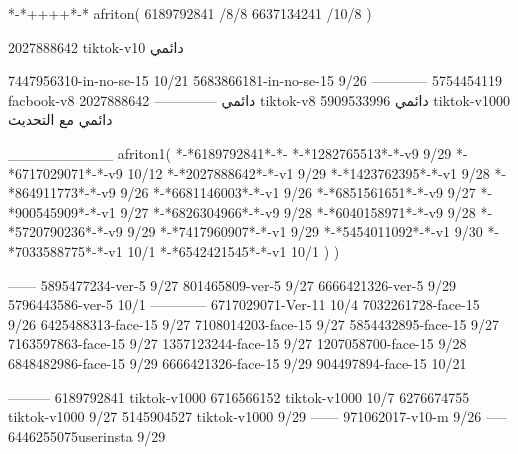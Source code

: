 *-*++++*-*
afriton(
6189792841 /8/8
6637134241 /10/8
)

2027888642 tiktok-v10
دائمي


7447956310-in-no-se-15 10/21
5683866181-in-no-se-15 9/26
------------
5754454119 facbook-v8
دائمي
--------------
2027888642 tiktok-v8
دائمي
5909533996 tiktok-v1000
دائمي مع التحديث

__________
afriton1(
*-*6189792841*-*-
*-*1282765513*-*-v9 9/29
*-*6717029071*-*-v9 10/12
*-*2027888642*-*-v1 9/29
*-*1423762395*-*-v1 9/28
*-*864911773*-*-v9 9/26
*-*6681146003*-*-v1 9/26
*-*6851561651*-*-v9 9/27
*-*900545909*-*-v1 9/27
*-*6826304966*-*-v9 9/28
*-*6040158971*-*-v9 9/28
*-*5720790236*-*-v9 9/29
*-*7417960907*-*-v1 9/29
*-*5454011092*-*-v1 9/30
*-*7033588775*-*-v1 10/1
*-*6542421545*-*-v1 10/1
)
)

------
5895477234-ver-5 9/27
801465809-ver-5 9/27
6666421326-ver-5 9/29
5796443586-ver-5 10/1
------------
6717029071-Ver-11
10/4
7032261728-face-15 9/26
6425488313-face-15 9/27
7108014203-face-15 9/27
5854432895-face-15 9/27
7163597863-face-15 9/27
1357123244-face-15 9/27
1207058700-face-15 9/28
6848482986-face-15 9/29
6666421326-face-15 9/29
904497894-face-15 10/21

---------
6189792841 tiktok-v1000
6716566152 tiktok-v1000
10/7
6276674755 tiktok-v1000
9/27
5145904527 tiktok-v1000
9/29
------
971062017-v10-m 9/26
-----
6446255075userinsta 9/29
